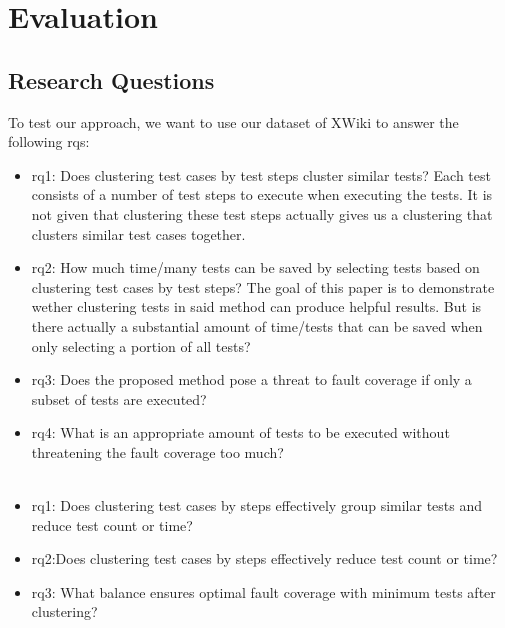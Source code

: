 \section{Evaluation}
\subsection{Research Questions}
To test our approach, we want to use our dataset of XWiki to answer the following  \acp{rq}:
\begin{itemize}
    \item \ac{rq}1: Does clustering test cases by test steps cluster similar tests?
    Each test consists of a number of test steps to execute when executing the tests. It is not given that clustering these test steps actually gives us a clustering that clusters similar test cases together.
    \item \ac{rq}2: How much time/many tests can be saved by selecting tests based on clustering test cases by test steps?
    The goal of this paper is to demonstrate wether clustering tests in said method can produce helpful results. But is there actually a substantial amount of time/tests that can be saved when only selecting a portion of all tests?
    \item \ac{rq}3: Does the proposed method pose a threat to fault coverage if only a subset of tests are executed?
    \item \ac{rq}4: What is an appropriate amount of tests to be executed without threatening the fault coverage too much?
    \\\\
    \item \ac{rq}1: Does clustering test cases by steps effectively group similar tests and reduce test count or time?
    \item \ac{rq}2:Does clustering test cases by steps effectively reduce test count or time?
    \item \ac{rq}3: What balance ensures optimal fault coverage with minimum tests after clustering?
\end{itemize}